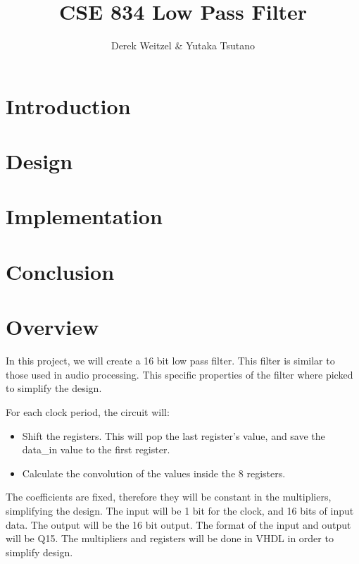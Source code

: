 \documentclass[12pt]{article}
\title{CSE 834 Low Pass Filter}
\author{Derek Weitzel \& Yutaka Tsutano}
\begin{document}
\maketitle

\section{Introduction} \label{sec:introduction}


\section{Design}
\label{sec:design}




\section{Implementation} \label{sec:implementation}


\section{Conclusion} \label{sec:conclusion}



\section{Overview}
In this project, we will create a 16 bit low pass filter.  This filter is similar to those used in audio processing.  This specific properties of the filter where picked to simplify the design.

For each clock period, the circuit will:
\begin{itemize}
\item Shift the registers.  This will pop the last register's value, and save the data\_in value to the first register.
\item Calculate the convolution of the values inside the 8 registers.
\end{itemize}

The coefficients are fixed, therefore they will be constant in the multipliers, simplifying the design.  The input will be 1 bit for the clock, and 16 bits of input data.  The output will be the 16 bit output.  The format of the input and output will be Q15.  The multipliers  and registers will be done in VHDL in order to simplify design.
\end{document}
